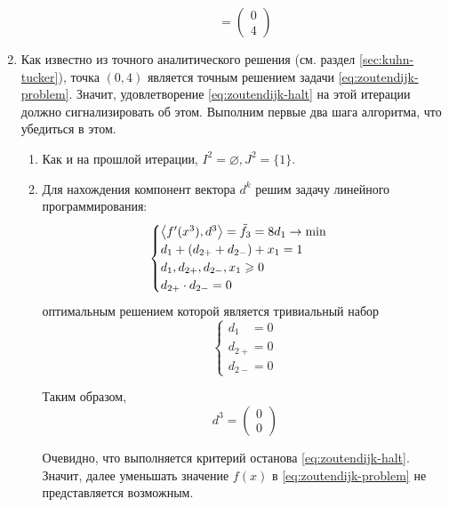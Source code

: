 \begin{enumerate}
\begin{enumerate}
\begin{equation*}
      = \begin{pmatrix} 0 \\ 4 \end{pmatrix}
    \end{equation*}
  \end{enumerate}
\item Как известно из точного аналитического решения (см. раздел
  \ref{sec:kuhn-tucker}), точка $(0, 4)$ является точным решением
  задачи \eqref{eq:zoutendijk-problem}. Значит, удовлетворение
  \eqref{eq:zoutendijk-halt} на этой итерации должно сигнализировать
  об этом. Выполним первые два шага алгоритма, что убедиться в этом.
  \begin{enumerate}
  \item Как и на прошлой итерации, $I^2 = \varnothing, J^2 = \{1\}$.
  \item Для нахождения компонент вектора $d^k$ решим задачу линейного
    программирования:
    \begin{equation*}
      \begin{cases}
        {\left \langle f'(x^3), d^3 \right \rangle} = \tilde{f}_3 =
        8d_1 \to \min \\
        d_1+(d_{2+}+d_{2-}) + x_1 = 1 \\
        d_1, d_{2+}, d_{2-}, x_1 \geqslant 0 \\
        d_{2+} \cdot d_{2-} = 0
      \end{cases}
    \end{equation*}
    оптимальным решением которой является тривиальный набор
    \begin{equation*}
      \begin{cases}
        d_{1\phantom{+}} = 0 \\
        d_{2+} = 0 \\
        d_{2-} = 0
      \end{cases}
    \end{equation*}

    Таким образом,
    \begin{equation*}
      d^3 = \begin{pmatrix} 0 \\ 0 \end{pmatrix}
    \end{equation*}

    Очевидно, что выполняется критерий останова
    \eqref{eq:zoutendijk-halt}. Значит, далее уменьшать значение
    $f(x)$ в \eqref{eq:zoutendijk-problem} не представляется
    возможным.
  \end{enumerate}
\end{enumerate}


